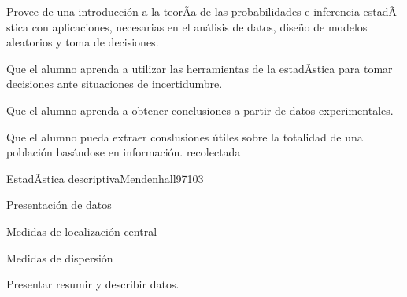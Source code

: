 
\begin{syllabus}


\begin{justification}
Provee de una introducción a la teorÃ­a de las probabilidades e inferencia estadÃ­stica con aplicaciones, necesarias en el análisis de datos, diseño de modelos aleatorios y toma de decisiones.
\end{justification}

\begin{goals}
\item Que el alumno aprenda a utilizar las herramientas de la estadÃ­stica para tomar decisiones ante situaciones de incertidumbre.
\item Que el alumno aprenda a obtener conclusiones a partir de datos experimentales.
\item Que el alumno pueda extraer conslusiones útiles sobre la totalidad de una población basándose en información. recolectada
\end{goals}

\begin{outcomes}
\end{outcomes}

\begin{unit}{EstadÃ­stica descriptiva}{Mendenhall97}{10}{3}
\begin{topics}
      \item Presentación de datos
      \item Medidas de localización central
      \item Medidas de dispersión
   \end{topics}

   \begin{unitgoals}
      \item Presentar resumir y describir datos.
   \end{unitgoals}
\end{unit}


\end{syllabus}
